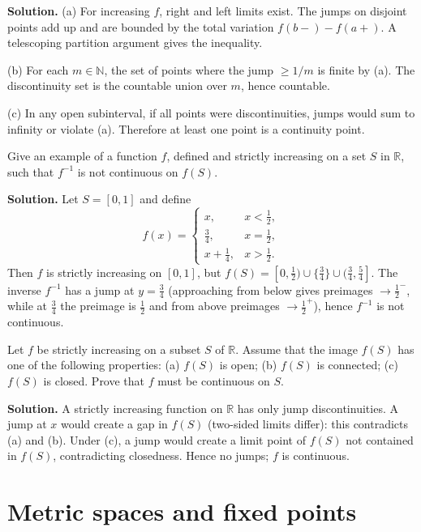 \noindent\textbf{Solution.}
(a) For increasing $f$, right and left limits exist. The jumps on disjoint points add up and are bounded by the total variation $f(b-)-f(a+)$. A telescoping partition argument gives the inequality.

(b) For each $m\in\mathbb{N}$, the set of points where the jump $\ge 1/m$ is finite by (a). The discontinuity set is the countable union over $m$, hence countable.

(c) In any open subinterval, if all points were discontinuities, jumps would sum to infinity or violate (a). Therefore at least one point is a continuity point.
\medskip

\begin{problembox}
Give an example of a function $f$, defined and strictly increasing on a set $S$ in $\mathbb{R}$, such that $f^{-1}$ is not continuous on $f(S)$.
\end{problembox}

\noindent\textbf{Solution.}
Let $S=[0,1]$ and define
\[
f(x)=\begin{cases}
x,& x<\tfrac12,\\
\tfrac34,& x=\tfrac12,\\
x+\tfrac14,& x>\tfrac12.
\end{cases}
\]
Then $f$ is strictly increasing on $[0,1]$, but $f(S)=[0,\tfrac12)\cup\{\tfrac34\}\cup(\tfrac34,\tfrac54]$. The inverse $f^{-1}$ has a jump at $y=\tfrac34$ (approaching from below gives preimages $\to\tfrac12^-$, while at $\tfrac34$ the preimage is $\tfrac12$ and from above preimages $\to\tfrac12^+$), hence $f^{-1}$ is not continuous.
\medskip

\begin{problembox}
Let $f$ be strictly increasing on a subset $S$ of $\mathbb{R}$. Assume that the image $f(S)$ has one of the following properties: 
(a) $f(S)$ is open; (b) $f(S)$ is connected; (c) $f(S)$ is closed. Prove that $f$ must be continuous on $S$.
\end{problembox}

\noindent\textbf{Solution.}
A strictly increasing function on $\mathbb{R}$ has only jump discontinuities. A jump at $x$ would create a gap in $f(S)$ (two-sided limits differ): this contradicts (a) and (b). Under (c), a jump would create a limit point of $f(S)$ not contained in $f(S)$, contradicting closedness. Hence no jumps; $f$ is continuous.
\medskip

\section{Metric spaces and fixed points}

